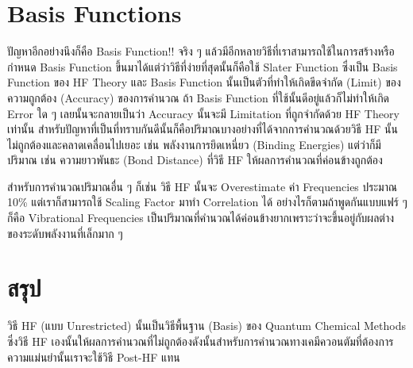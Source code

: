 \section{Basis Functions}

ปัญหาอีกอย่างนึงก็คือ Basis Function!! จริง ๆ แล้วมีอีกหลายวิธีที่เราสามารถใช้ในการสร้างหรือกำหนด Basis Function ขึ้นมาได้แต่ว่าวิธีที่ง่ายที่สุดนั้นก็คือใช้ Slater Function ซึ่งเป็น Basis Function ของ HF Theory และ Basis Function นั้นเป็นตัวที่ทำให้เกิดขีดจำกัด (Limit) ของความถูกต้อง (Accuracy) ของการคำนวณ ถ้า Basis Function ที่ใช้นั้นดีอยู่แล้วก็ไม่ทำให้เกิด Error ใด ๆ เลยนั้นจะกลายเป็นว่า Accuracy นั้นจะมี Limitation ที่ถูกจำกัดด้วย HF Theory เท่านั้น สำหรับปัญหาที่เป็นที่ทราบกันดีนั้นก็คือปริมาณบางอย่างที่ได้จากการคำนวณด้วยวิธี HF นั้นไม่ถูกต้องและคลาดเคลื่อนไปเยอะ เช่น พลังงานการยึดเหนี่ยว (Binding Energies) แต่ว่าก็มีปริมาณ เช่น ความยาวพันธะ (Bond Distance) ที่วิธี HF ให้ผลการคำนวณที่ค่อนข้างถูกต้อง

สำหรับการคำนวณปริมาณอื่น ๆ ก็เช่น วิธี HF นั้นจะ Overestimate ค่า Frequencies ประมาณ 10\% แต่เราก็สามารถใช้ Scaling Factor มาทำ Correlation ได้ อย่างไรก็ตามถ้าพูดกันแบบแฟร์ ๆ ก็คือ Vibrational Frequencies เป็นปริมาณที่คำนวณได้ค่อนข้างยากเพราะว่าจะขึ้นอยู่กับผลต่างของระดับพลังงานที่เล็กมาก ๆ

\section{สรุป}

วิธี HF (แบบ Unrestricted) นั้นเป็นวิธีพื้นฐาน (Basis) ของ Quantum Chemical Methods ซึ่งวิธี HF เองนั้นให้ผลการคำนวณที่ไม่ถูกต้องดังนั้นสำหรับการคำนวณทางเคมีควอนตัมที่ต้องการความแม่นยำนั้นเราจะใช้วิธี Post-HF แทน
